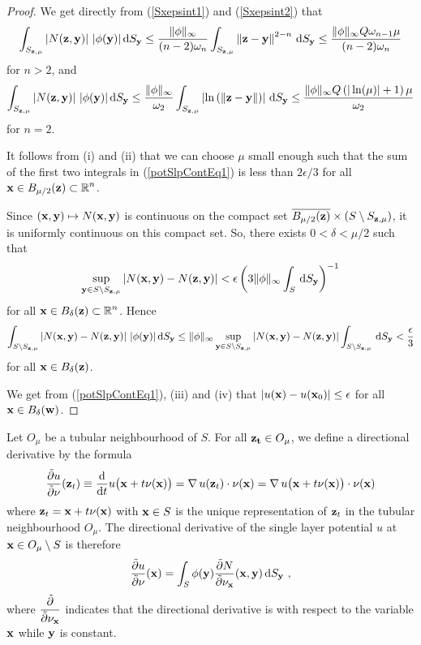 \begin{proof}
 We get directly from (\ref{Sxepsint1}) and
(\ref{Sxepsint2}) that
\[
\int_{S_{\VEC{z},\mu}} \left| N(\VEC{z},\VEC{y}) \right|\,
|\phi(\VEC{y})| \dss{S}{y}
\leq \frac{\|\phi\|_\infty}{(n-2)\omega_n} 
\int_{S_{\VEC{z},\mu}} \left\|\VEC{z} -\VEC{y} \right\|^{2-n} \dss{S}{y}
\leq \frac{\|\phi\|_\infty Q \omega_{n-1} \mu}{(n-2)\omega_n} 
\]
for $n>2$, and
\[
\int_{S_{\VEC{z},\mu}} \left| N(\VEC{z},\VEC{y}) \right|\,
|\phi(\VEC{y})| \dss{S}{y}
\leq \frac{\|\phi\|_\infty}{\omega_2} 
\int_{S_{\VEC{z},\mu}} \left| \ln\left(
\left\|\VEC{z} -\VEC{y} \right\| \right)\right|  \dss{S}{y}
\leq \frac{ \|\phi\|_\infty Q \left(|\ln(\mu)|+1\right)\mu}{\omega_2} 
\]
for $n= 2$.

  It follows from (i) and (ii) that we can choose $\mu$
small enough such that the sum of the first two integrals
in (\ref{potSlpContEq1}) is less than $2\epsilon/3$ for all
$\displaystyle \VEC{x} \in B_{\mu/2}(\VEC{z}) \subset \RR^n$.

Since $(\VEC{x},\VEC{y}) \mapsto N(\VEC{x},\VEC{y})$ is continuous on
the compact set
$\overline{B_{\mu/2}(\VEC{z})} \times (S \setminus S_{\VEC{z},\mu})$,
it is uniformly continuous on this compact set.  So, there exists
$0 < \delta < \mu/2$ such that
\[
\sup_{\VEC{y} \in S \setminus S_{\VEC{z},\mu}}
\left| N(\VEC{x},\VEC{y}) - N(\VEC{z},\VEC{y}) \right| <
\epsilon\left( 3\|\phi\|_\infty \int_S \dss{S}{y}\right)^{-1}
\]
for all $\displaystyle \VEC{x} \in B_\delta(\VEC{z}) \subset \RR^n$.
Hence
\[
\int_{S \setminus S_{\VEC{z},\mu}}
\left| N(\VEC{x},\VEC{y}) - N(\VEC{z},\VEC{y}) \right|
\,|\phi(\VEC{y}) |\dss{S}{y}
\leq \|\phi\|_\infty \sup_{\VEC{y} \in S \setminus S_{\VEC{z},\mu}}
\left| N(\VEC{x},\VEC{y}) - N(\VEC{z},\VEC{y}) \right| 
\int_{S \setminus S_{\VEC{z},\mu}} \dss{S}{y}
< \frac{\epsilon}{3}
\]
for all $\VEC{x} \in B_\delta(\VEC{z})$.

 We get from (\ref{potSlpContEq1}), (iii) and (iv) that
$\displaystyle \left| u(\VEC{x}) - u(\VEC{x}_0) \right| \leq \epsilon$ for all
$\VEC{x} \in B_\delta(\VEC{w})$.
\end{proof}

Let $O_\mu$ be a tubular neighbourhood of $S$.  For all
$\VEC{z_t} \in O_\mu$, we define a directional derivative by the formula
\[
\pdydxS{u}{\VEC{\nu}}(\VEC{z}_t)
\equiv \dfdx{u\big(\VEC{x}+t\VEC{\nu}(\VEC{x})\big)}{t}
= \graD u(\VEC{z}_t) \cdot \VEC{\nu}(\VEC{x})
= \graD u\big(\VEC{x}+t\VEC{\nu}(\VEC{x})\big) \cdot \VEC{\nu}(\VEC{x})
\]
where $\VEC{z}_t = \VEC{x} + t\nu(\VEC{x})$ with $\VEC{x} \in S$
is the unique representation of $\VEC{z}_t$ in the tubular neighbourhood
$O_\mu$.  The directional derivative of the single layer
potential $u$ at $\VEC{x}\in O_\mu \setminus S$ is
therefore
\[
\pdydxS{u}{\VEC{\nu}}(\VEC{x}) = \int_S 
 \phi(\VEC{y}) \pdydxS{N}{\VEC{\nu}_{\VEC{x}}}(\VEC{x},\VEC{y}) \dss{S}{y} \ ,
\]
where $\displaystyle \pdydxS{}{\VEC{\nu}_{\VEC{x}}}$ indicates that the
directional derivative is with respect to the variable $\VEC{x}$ while
$\VEC{y}$ is constant.

